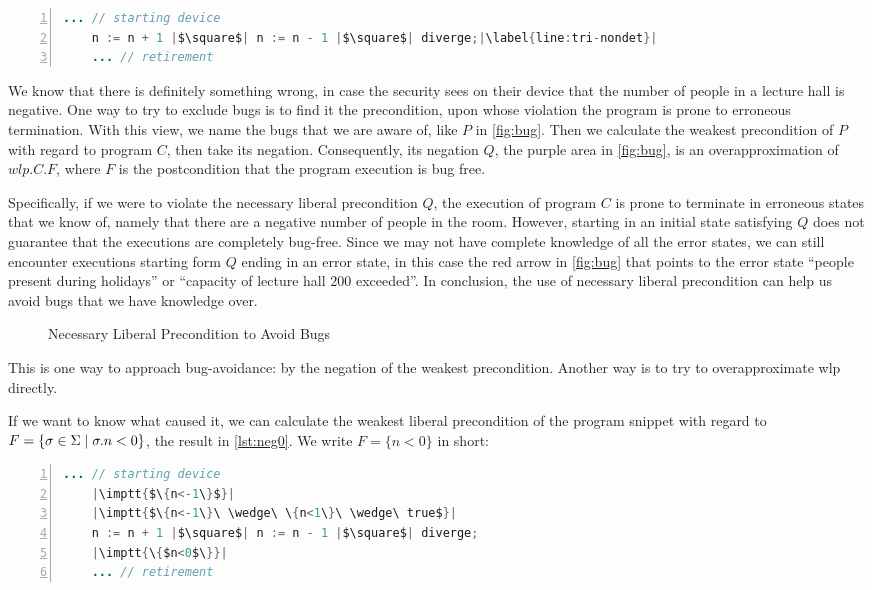 \begin{lstlisting}[caption={Door with Sensors Counting Number of People Present}, label={lst:door}, language=java, numbers=left, stepnumber=1, captionpos=b,escapechar=|,frame=single]
	... // starting device
	n := n + 1 |$\square$| n := n - 1 |$\square$| diverge;|\label{line:tri-nondet}|
	... // retirement  
\end{lstlisting}

We know that there is definitely something wrong, in case the security sees on their device that the number of people in a lecture hall is negative. 
One way to try to exclude bugs is to find it the precondition, upon whose violation the program is prone to erroneous termination. 
With this view, we name the bugs that we are aware of, like $P$ in \autoref{fig:bug}. 
Then we calculate the weakest precondition of $P$ with regard to program $C$, then take its negation. 
Consequently, its negation $Q$, the purple area in \autoref{fig:bug}, is an overapproximation of $wlp.C.F$, where $F$ is the postcondition that the program execution is bug free. 

Specifically, if we were to violate the necessary liberal precondition $Q$, the execution of program $C$ is prone to terminate in erroneous states that we know of, namely that there are a negative number of people in the room. %
However, starting in an initial state satisfying $Q$ does not guarantee that the executions are completely bug-free. 
Since we may not have complete knowledge of all the error states, we can still encounter executions starting form $Q$ ending in an error state, in this case the red arrow in \autoref{fig:bug} that points to the error state ``people present during holidays'' or ``capacity of lecture hall $200$ exceeded''. 
In conclusion, the use of necessary liberal precondition can help us avoid bugs that we have knowledge over. 

\begin{figure}[t]
	\centering
	
	\caption{Necessary Liberal Precondition to Avoid Bugs}
	\label{fig:bug}
\end{figure}

This is one way to approach bug-avoidance: by the negation of the weakest precondition. 
Another way is to try to overapproximate wlp directly. 

If we want to know what caused it, we can calculate the weakest liberal precondition of the program snippet with regard to $F=\{\sigma\in\S\mid\sigma.n<0\}$, the result in \autoref{lst:neg0}. 
We write $F=\{n<0\}$ in short: 
\begin{lstlisting}[caption={Weakest (Liberal) Precondition w.r.t Postcondition $F=\{\sigma\in\S\mid\sigma.n<0\}$ }, label={lst:neg0}, language=java, numbers=left, stepnumber=1, captionpos=b,escapechar=|,frame=single]
	... // starting device
	|\imptt{$\{n<-1\}$}|
	|\imptt{$\{n<-1\}\ \wedge\ \{n<1\}\ \wedge\ true$}|
	n := n + 1 |$\square$| n := n - 1 |$\square$| diverge;
	|\imptt{\{$n<0$\}}|
	... // retirement   
\end{lstlisting}

